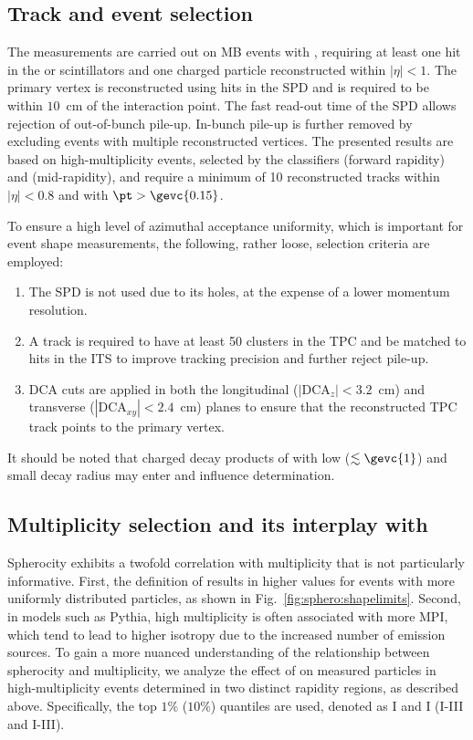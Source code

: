 \subsection{Track and event selection}\label{sec:sphero:eventtracks}

The measurements are carried out on MB events with \INELgtO, requiring at least one hit in the \VOA or \VOC scintillators and one charged particle reconstructed within $|\eta|<1$. The primary vertex is reconstructed using hits in the SPD and is required to be within $10$~cm of the interaction point. The fast read-out time of the SPD allows rejection of out-of-bunch pile-up. In-bunch pile-up is further removed by excluding events with multiple reconstructed vertices. The presented results are based on high-multiplicity events, selected by the classifiers \VOM (forward rapidity) and \tracklet (mid-rapidity), and require a minimum of 10 reconstructed tracks within $|\eta|<0.8$ and with $\pt>\gevc{0.15}$.

To ensure a high level of azimuthal acceptance uniformity, which is important for event shape measurements, the following, rather loose, selection criteria are employed:
\begin{enumerate}
\item The SPD is not used due to its holes, at the expense of a lower momentum resolution.
\item A track is required to have at least 50 clusters in the TPC and be matched to hits in the ITS to improve tracking precision and further reject  pile-up.
\item DCA cuts are applied in both the longitudinal ($|\mathrm{DCA}_z|<3.2$~cm) and transverse ($|\mathrm{DCA}_{xy}|<2.4$~cm) planes to ensure that the reconstructed TPC track points to the primary vertex.
\end{enumerate}
It should be noted that charged decay products of \VOs with low \pt ($\lesssim \gevc{1}$) and small decay radius may enter and influence \SOPT determination.

\subsection{Multiplicity selection and its interplay with \SOPT}

Spherocity exhibits a twofold correlation with multiplicity that is not particularly informative. First, the definition of \SOPT results in higher values for events with more uniformly distributed particles, as shown in Fig.~\ref{fig:sphero:shapelimits}. Second, in models such as Pythia, high multiplicity is often associated with more MPI, which tend to lead to higher isotropy due to the increased number of emission sources. To gain a more nuanced understanding of the relationship between spherocity and multiplicity, we analyze the effect of \SOPT on measured particles in high-multiplicity events determined in two distinct rapidity regions, as described above. Specifically, the top $1\%$ ($10\%$) quantiles are used, denoted as \VOM I and \NSPD I (\VOM I-III and \NSPD I-III).

